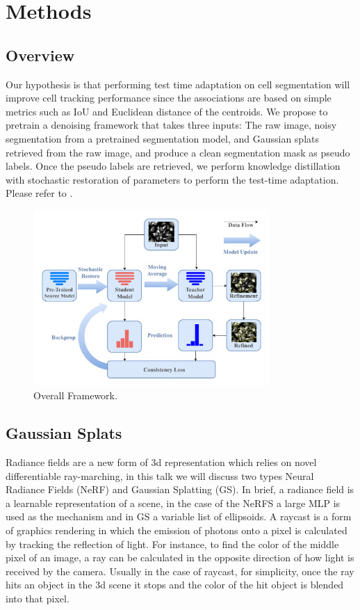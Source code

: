 \section{Methods}

\subsection{Overview}

Our hypothesis is that performing test time adaptation on cell segmentation will improve cell tracking performance since the associations are based on simple metrics such as IoU and Euclidean distance of the centroids. We propose to pretrain a denoising framework that takes three inputs: The raw image, noisy segmentation from a pretrained segmentation model, and Gaussian splats retrieved from the raw image, and produce a clean segmentation mask as pseudo labels.
Once the pseudo labels are retrieved, we perform knowledge distillation with stochastic restoration of parameters to perform the test-time adaptation. Please refer to .


\begin{figure}[t]
    \centering
    \includegraphics[width=9cm]{figs/project_proposal.pdf}
    \caption{Overall Framework.}
    \label{fig:overall_framework}
\end{figure}

\subsection{Gaussian Splats}

Radiance fields are a new form of 3d representation which relies on novel differentiable ray-marching, in this talk we will discuss two types Neural Radiance Fields (NeRF) and Gaussian Splatting (GS).   In brief, a radiance field is a learnable representation of a scene, in the case of the NeRFS a large MLP is used as the mechanism and in GS a variable list of ellipsoids.  A raycast is a form of graphics rendering in which the emission of photons onto a pixel is calculated by tracking the reflection of light.  For instance, to find the color of the middle pixel of an image, a ray can be calculated in the opposite direction of how light is received by the camera.  Usually in the case of raycast, for simplicity, once the ray hits an object in the 3d scene it stops and the color of the hit object is blended into that pixel.  \\

